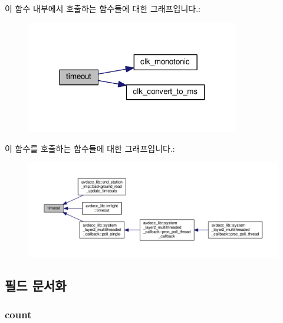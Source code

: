 이 함수 내부에서 호출하는 함수들에 대한 그래프입니다.\+:
\nopagebreak
\begin{figure}[H]
\begin{center}
\leavevmode
\includegraphics[width=264pt]{classavdecc__lib_1_1timer_aa8795f32f3da0bbd7b3fcefe73818239_cgraph}
\end{center}
\end{figure}




이 함수를 호출하는 함수들에 대한 그래프입니다.\+:
\nopagebreak
\begin{figure}[H]
\begin{center}
\leavevmode
\includegraphics[width=350pt]{classavdecc__lib_1_1timer_aa8795f32f3da0bbd7b3fcefe73818239_icgraph}
\end{center}
\end{figure}




\subsection{필드 문서화}
\subsubsection[{\texorpdfstring{count}{count}}]{ count\hspace{0.3cm}{\ttfamily [private]}}\hypertarget{classavdecc__lib_1_1timer_a86988a65e0d3ece7990c032c159786d6}{}\label{classavdecc__lib_1_1timer_a86988a65e0d3ece7990c032c159786d6}


